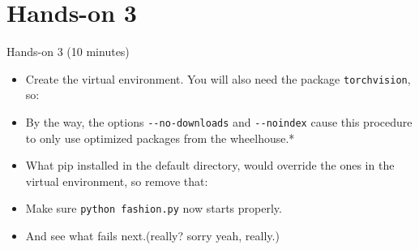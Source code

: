 \documentclass[
  10pt,
  ignorenonframetext,
  aspectratio=169,handout]{beamer}
\newenvironment{Shaded}{\begin{snugshade}}{\end{snugshade}}
\newcommand{\AttributeTok}[1]{\textcolor[rgb]{0.80,0.80,0.80}{#1}}
\newcommand{\ExtensionTok}[1]{\textcolor[rgb]{0.80,0.80,0.80}{#1}}
\newcommand{\KeywordTok}[1]{\textcolor[rgb]{0.94,0.87,0.69}{#1}}
\newcommand{\NormalTok}[1]{\textcolor[rgb]{0.80,0.80,0.80}{#1}}
\newcommand{\PreprocessorTok}[1]{\textcolor[rgb]{1.00,0.81,0.69}{\textbf{#1}}}
\newcommand{\VariableTok}[1]{\textcolor[rgb]{0.80,0.80,0.80}{#1}}
\providecommand{\tightlist}{%
  \setlength{\itemsep}{0pt}\setlength{\parskip}{0pt}}
\begin{document}
\section{Hands-on 3}\label{hands-on-3}

\begin{frame}[fragile]{Hands-on 3 (10 minutes)}
\label{hands-on-3-10-minutes}
\begin{itemize}
\tightlist
\item
  Create the virtual environment. You will also need the package \texttt{torchvision}, so:
\end{itemize}

\begin{Shaded}
\end{Shaded}

\begin{itemize}
\item
  By the way, the options \texttt{-\/-no-downloads} and \texttt{-\/-noindex} cause this procedure to only use optimized packages from the wheelhouse.*
\item
  What pip installed in the default directory, would override the ones in the virtual environment, so remove that:
\end{itemize}

\begin{Shaded}
\end{Shaded}

\begin{itemize}
\item
  Make sure \texttt{python\ fashion.py} now starts properly.

  \pause
\item
  And see what fails next.\pause (really? sorry yeah, really.)
\end{itemize}
\end{frame}
\end{document}
